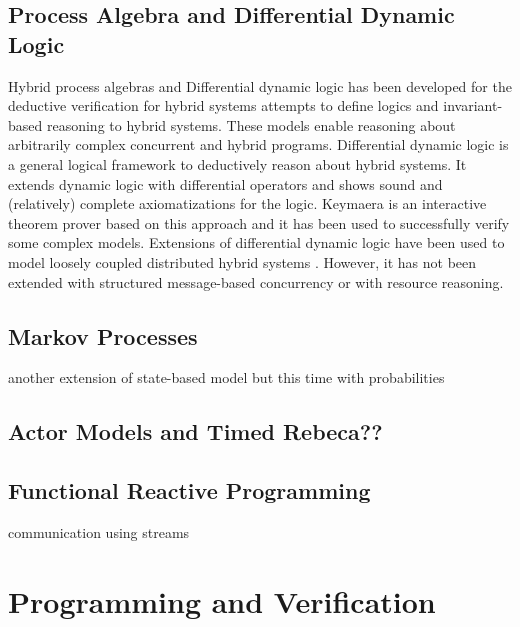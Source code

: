 \documentclass[
graybox,
envcountchap
]{svmult}
\begin{document}
\begin{bibunit}
    \subsection{Process Algebra and Differential Dynamic Logic}

Hybrid process algebras \cite{RoundsS03,BERGSTRA2005215,10.1007/978-3-319-53733-7_8,DBLP:conf/case/CampbellTLPOF16} and Differential dynamic logic \cite{PlatzerBook,Platzer18,PlatzerT18} has been developed for the deductive verification for hybrid systems attempts to define logics and invariant-based reasoning to hybrid systems.
These models enable reasoning about arbitrarily complex concurrent and hybrid programs.
Differential dynamic logic is a general logical framework to deductively reason about hybrid systems.
It extends dynamic logic with differential operators and shows sound and (relatively) complete axiomatizations for the logic.
Keymaera \cite{QueselMLAP16} is an interactive theorem prover based on this approach and it has been used to successfully verify some complex models.
Extensions of differential dynamic logic have been used to model loosely coupled distributed hybrid systems \cite{Platzer12}.
However, it has not been extended with structured message-based concurrency or with resource reasoning.


    \subsection{Markov Processes}

    another extension of state-based model but this time with probabilities

\subsection{Actor Models and Timed Rebeca??}

\subsection{Functional Reactive Programming}

    communication using streams
    
\section{Programming and Verification}\label{sec:Programming}

\end{bibunit}
\end{document}
